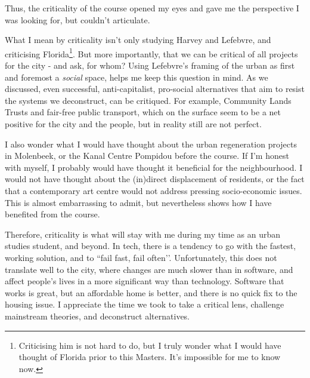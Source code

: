 \documentclass[12pt]{article}
\begin{document}
Thus, the criticality of the course opened my eyes and gave me the perspective I was looking for, but couldn’t articulate. 

What I mean by criticality isn’t only studying Harvey and Lefebvre, and criticising Florida\footnote{Criticising him is not hard to do, but I truly wonder what I would have thought of Florida prior to this Masters. It’s impossible for me to know now.}. But more importantly, that we can be critical of all projects for the city - and ask, for whom? Using Lefebvre’s framing of the urban as first and foremost a \textit{social} space, helps me keep this question in mind.
As we discussed, even successful, anti-capitalist, pro-social alternatives that aim to resist the systems we deconstruct, can be critiqued. For example, Community Lands Trusts and fair-free public transport, which on the surface seem to be a net positive for the city and the people, but in reality still are not perfect.

I also wonder what I would have thought about the urban regeneration projects in Molenbeek, or the Kanal Centre Pompidou before the course. If I’m honest with myself, I probably would have thought it beneficial for the neighbourhood. I would not have thought about the (in)direct displacement of residents, or the fact that a contemporary art centre would not address pressing socio-economic issues. This is almost embarrassing to admit, but nevertheless shows how I have benefited from the course.

Therefore, criticality is what will stay with me during my time as an urban studies student, and beyond. In tech, there is a tendency to go with the fastest, working solution, and to ``fail fast, fail often’’. Unfortunately, this does not translate well to the city, where changes are much slower than in software, and affect people’s lives in a more significant way than technology. Software that works is great, but an affordable home is better, and there is no quick fix to the housing issue.
I appreciate the time we took to take a critical lens, challenge mainstream theories, and deconstruct alternatives.

\printbibliography 
\end{document}
